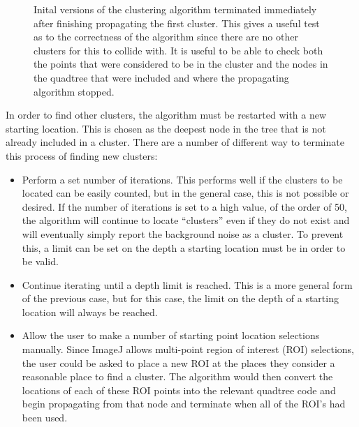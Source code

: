 \begin{figure}[tbhp]
\begin{subfigure}[c]{4.2cm}
		\caption{}\label{fig:single-cluster-lines}
	\end{subfigure}
	\caption{Inital versions of the clustering algorithm terminated immediately
		after finishing propagating the first cluster. This gives a useful test
		as to the correctness of the algorithm since there are no other
		clusters for this to collide with. It is useful to be able to check
		both  the points that were considered
		to be in the cluster and  the nodes in
		the quadtree that were included and where the propagating algorithm
		stopped.} \label{fig:single-cluster}
\end{figure}

In order to find other clusters, the algorithm must be restarted with a new
starting location. This is chosen as the deepest node in the tree that is not
already included in a cluster. There are a number of different way to terminate
this process of finding new clusters:

\begin{itemize}

	\item Perform a set number of iterations. This performs well if the
		clusters to be located can be easily counted, but in the general case,
		this is not possible or desired. If the number of iterations is set to
		a high value, of the order of 50, the algorithm will continue to locate
		``clusters'' even if they do not exist and will eventually simply
		report the background noise as a cluster. To prevent this, a limit can
		be set on the depth a starting location must be in order to be valid.

	\item Continue iterating until a depth limit is reached. This is a more
		general form of the previous case, but for this case, the limit on the
		depth of a starting location will always be reached.

	\item Allow the user to make a number of starting point location selections
		manually. Since ImageJ allows multi-point region of interest (ROI)
		selections, the user could be asked to place a new ROI at the places
		they consider a reasonable place to find a cluster. The algorithm would
		then convert the locations of each of these ROI points into the
		relevant quadtree code and begin propagating from that node and
		terminate when all of the ROI's had been used.

\end{itemize}

